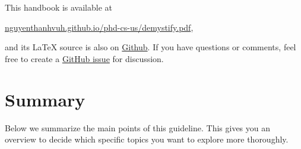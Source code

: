 \documentclass[oneside,11pt]{memoir}
\begin{document}
This handbook is available at

\begin{center}
  \href{https://nguyenthanhvuh.github.io/phd-cs-us/demystify.pdf}{nguyenthanhvuh.github.io/phd-cs-us/demystify.pdf},
\end{center}

\noindent and its \LaTeX{} source is also on \href{https://github.com/nguyenthanhvuh/phd-cs-us}{Github}. If you have questions or comments, feel free to create a \href{https://github.com/nguyenthanhvuh/phd-cs-us/issues}{GitHub issue} for discussion.

\newpage
\tableofcontents*

\chapter{Summary}\label{sec:summary}

Below we summarize the main points of this guideline. This gives you an overview to decide which specific topics you want to explore more thoroughly.
\end{document}
